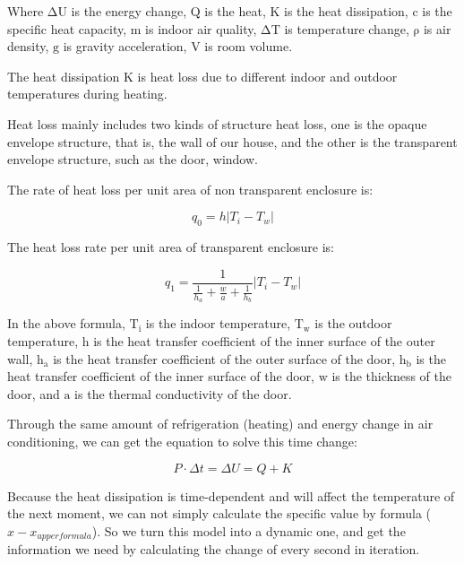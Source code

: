 \documentclass{mcmthesis}
\begin{document}
				Where $\mathrm{\Delta U}$ is the energy change, $\mathrm{Q}$ is the heat, $\mathrm{K}$ is the heat dissipation, $\mathrm{c}$ is the specific heat capacity, $\mathrm{m}$ is indoor air quality, $\mathrm{\Delta T}$ is temperature change, $\mathrm{\rho}$ is air density, $\mathrm{g}$ is gravity acceleration, $\mathrm{V}$ is room volume.
				
				The heat dissipation $\mathrm{K}$ is heat loss due to different indoor and outdoor temperatures during heating.
				
				Heat loss mainly includes two kinds of structure heat loss, one is the opaque envelope structure, that is, the wall of our house, and the other is the transparent envelope structure, such as the door, window.
				
				The rate of heat loss per unit area of non transparent enclosure is:
				
				\begin{equation}
					q_0 = h|T_i - T_w|
				\end{equation}
				
				The heat loss rate per unit area of transparent enclosure is:
				
				\begin{equation}
					q_1 = \frac{1}{\frac{1}{h_a}+\frac{w}{a}+\frac{1}{h_b}}|T_i - T_w|
				\end{equation}
				
				In the above formula, $\mathrm{T_i}$ is the indoor temperature, $\mathrm{T_w}$ is the outdoor temperature, $\mathrm{h}$ is the heat transfer coefficient of the inner surface of the outer wall, $\mathrm{h_a}$ is the heat transfer coefficient of the outer surface of the door, $\mathrm{h_b}$ is the heat transfer coefficient of the inner surface of the door, $\mathrm{w}$ is the thickness of the door, and $\mathrm{a}$ is the thermal conductivity of the door.
				
				Through the same amount of refrigeration (heating) and energy change in air conditioning, we can get the equation to solve this time change:
				
				\begin{equation}
					P \cdot \Delta t = \Delta U = Q + K
				\end{equation}
				
				Because the heat dissipation is time-dependent and will affect the temperature of the next moment, we can not simply calculate the specific value by formula ($x-x_{upper formula}$). So we turn this model into a dynamic one, and get the information we need by calculating the change of every second in iteration.
				
\end{document}
